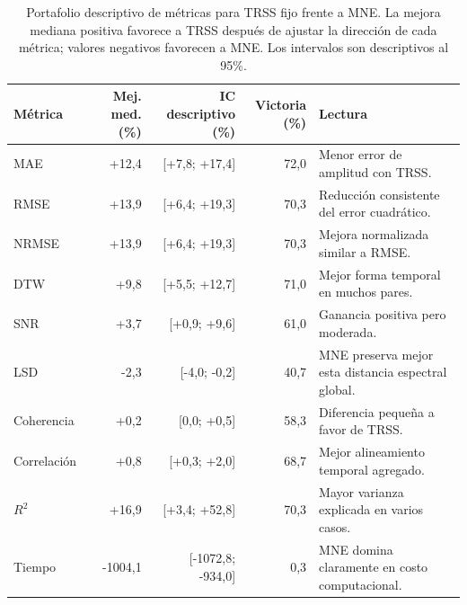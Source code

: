 \begin{table}[htbp]
\centering
\footnotesize
\setlength{\tabcolsep}{4pt}
\caption{Portafolio descriptivo de métricas para TRSS fijo frente a MNE. La mejora mediana positiva favorece a TRSS después de ajustar la dirección de cada métrica; valores negativos favorecen a MNE. Los intervalos son descriptivos al 95\%.}
\label{tab:ch6_metric_portfolio}
\begin{tabular}{@{}lrrrp{2.8cm}@{}}
\toprule
Métrica & Mej. med. (\%) & IC descriptivo (\%) & Victoria (\%) & Lectura \\
\midrule
MAE & +12{,}4 & [+7{,}8; +17{,}4] & 72{,}0 & Menor error de amplitud con TRSS. \\
RMSE & +13{,}9 & [+6{,}4; +19{,}3] & 70{,}3 & Reducción consistente del error cuadrático. \\
NRMSE & +13{,}9 & [+6{,}4; +19{,}3] & 70{,}3 & Mejora normalizada similar a RMSE. \\
DTW & +9{,}8 & [+5{,}5; +12{,}7] & 71{,}0 & Mejor forma temporal en muchos pares. \\
SNR & +3{,}7 & [+0{,}9; +9{,}6] & 61{,}0 & Ganancia positiva pero moderada. \\
LSD & -2{,}3 & [-4{,}0; -0{,}2] & 40{,}7 & MNE preserva mejor esta distancia espectral global. \\
Coherencia & +0{,}2 & [0{,}0; +0{,}5] & 58{,}3 & Diferencia pequeña a favor de TRSS. \\
Correlación & +0{,}8 & [+0{,}3; +2{,}0] & 68{,}7 & Mejor alineamiento temporal agregado. \\
$R^2$ & +16{,}9 & [+3{,}4; +52{,}8] & 70{,}3 & Mayor varianza explicada en varios casos. \\
Tiempo & -1004{,}1 & [-1072{,}8; -934{,}0] & 0{,}3 & MNE domina claramente en costo computacional. \\
\bottomrule
\end{tabular}
\end{table}
